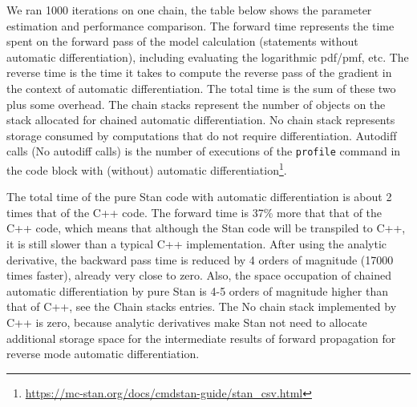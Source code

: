 \documentclass[11pt]{article}
\begin{document}
We ran 1000 iterations on one chain, the table below shows the parameter estimation and performance comparison. The forward time represents the time spent on the forward pass of the model calculation (statements without automatic differentiation), including evaluating the logarithmic pdf/pmf, etc. The reverse time is the time it takes to compute the reverse pass of the gradient in the context of automatic differentiation. The total time is the sum of these two plus some overhead. The chain stacks represent the number of objects on the stack allocated for chained automatic differentiation. No chain stack represents storage consumed by computations that do not require differentiation. Autodif‌f calls (No autodiff calls) is the number of executions of the \verb|profile| command in the code block with (without) automatic differentiation\footnote{\url{https://mc-stan.org/docs/cmdstan-guide/stan_csv.html}}.



The total time of the pure Stan code with automatic differentiation is about 2 times that of the C++ code. The forward time is 37\% more that that of the C++ code, which means that although the Stan code will be transpiled to C++, it is still slower than a typical C++ implementation. After using the analytic derivative, the backward pass time is reduced by 4 orders of magnitude (17000 times faster), already very close to zero. Also, the space occupation of chained automatic differentiation by pure Stan is 4-5 orders of magnitude higher than that of C++, see the Chain stacks entries. The No chain stack implemented by C++ is zero, because analytic derivatives make Stan not need to allocate additional storage space for the intermediate results of forward propagation for reverse mode automatic differentiation. 
\end{document}
